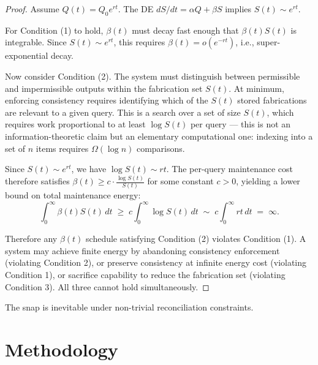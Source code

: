 \documentclass[11pt,a4paper]{article}
\begin{document}
\begin{proof}
Assume $Q(t) = Q_0 e^{rt}$. The DE $dS/dt = \alpha Q + \beta S$ implies $S(t) \sim e^{rt}$.

For Condition (1) to hold, $\beta(t)$ must decay fast enough that $\beta(t) S(t)$ is integrable. Since $S(t) \sim e^{rt}$, this requires $\beta(t) = o(e^{-rt})$, i.e., super-exponential decay.

Now consider Condition (2). The system must distinguish between permissible and impermissible outputs within the fabrication set $S(t)$. At minimum, enforcing consistency requires identifying which of the $S(t)$ stored fabrications are relevant to a given query. This is a search over a set of size $S(t)$, which requires work proportional to at least $\log S(t)$ per query --- this is not an information-theoretic claim but an elementary computational one: indexing into a set of $n$ items requires $\Omega(\log n)$ comparisons.

Since $S(t) \sim e^{rt}$, we have $\log S(t) \sim rt$. The per-query maintenance cost therefore satisfies $\beta(t) \ge c \cdot \frac{\log S(t)}{S(t)}$ for some constant $c > 0$, yielding a lower bound on total maintenance energy:
\[
\int_0^\infty \beta(t) S(t)\, dt \;\ge\; c \int_0^\infty \log S(t)\, dt \;\sim\; c \int_0^\infty rt\, dt \;=\; \infty.
\]

Therefore any $\beta(t)$ schedule satisfying Condition (2) violates Condition (1). A system may achieve finite energy by abandoning consistency enforcement (violating Condition 2), or preserve consistency at infinite energy cost (violating Condition 1), or sacrifice capability to reduce the fabrication set (violating Condition 3). All three cannot hold simultaneously.
\end{proof}

The snap is inevitable under non-trivial reconciliation constraints.

\section{Methodology}
\end{document}
